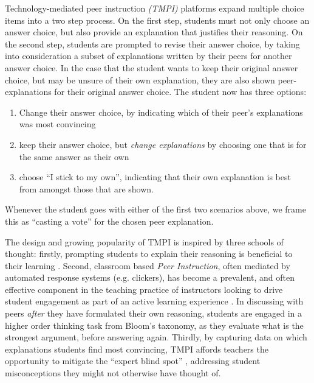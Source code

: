 \documentclass[acmsmall]{acmart}
\begin{document}
Technology-mediated peer instruction \textit{(TMPI)} platforms 
\cite{charles_harnessing_2019}\cite{univeristy_of_british_columbia_ubc/ubcpi_2019}
expand multiple choice items into a two step process.
On the first step, students must not only choose an answer choice, but also 
provide an explanation that justifies their reasoning. 
On the second step, students are prompted to revise their answer choice, by 
taking into consideration a subset of explanations written by their peers for
another answer choice.
In the case that the student wants to keep their original answer choice, but 
may be unsure of their own explanation, they are also shown peer-explanations 
for their original answer choice. 
The student now has three options:
\begin{enumerate}
	\item Change their answer choice, by indicating which of their peer's 
	explanations was most convincing
	\item keep their answer choice, but \textit{change explanations} by 
	choosing one that is for the same answer as their own
	\item choose ``I stick to my own'', indicating that their own explanation 
	is best from amongst those that are shown.
\end{enumerate}

Whenever the student goes with either of the first two scenarios above, we 
frame this as ``casting a vote'' for the chosen peer explanation.

The design and growing popularity of TMPI is inspired by three schools of 
thought: firstly, prompting students to explain their reasoning is beneficial 
to their learning \cite{chi_eliciting_1994}. 
Second, classroom based \textit{Peer Instruction}\cite{crouch_peer_2001}, often 
mediated by automated response systems (e.g. clickers), has become a prevalent, 
and often effective component in the teaching practice of instructors looking 
to drive student engagement as part of an active learning experience 
\cite{charles_beyond_2015}. 
In discussing with peers \textit{after} they have formulated their own 
reasoning, students are engaged in a higher order thinking task from Bloom's 
taxonomy, as they evaluate what is the strongest argument, before answering 
again.
Thirdly, by capturing data on which explanations students find most convincing, 
TMPI affords teachers the opportunity to mitigate the ``expert blind spot'' 
\cite{nathan_expert_2001}, addressing student misconceptions they might not 
otherwise have thought of.
\end{document}
